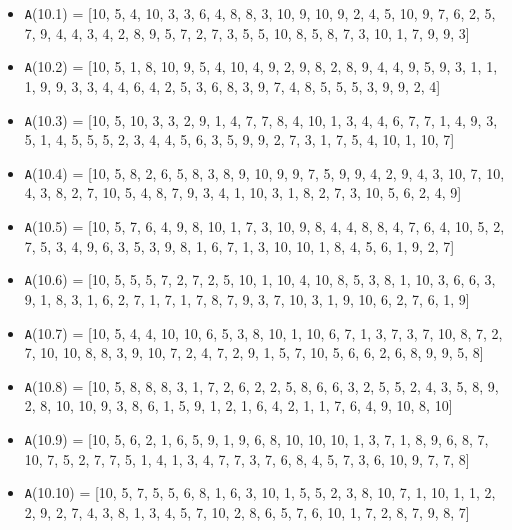 \documentclass[runningheads, a4paper]{llncs}
\begin{document}
\begin{itemize}
	\item {\texttt A(10.1) = } [10, 5, 4, 10, 3, 3, 6, 4, 8, 8, 3, 10, 9, 10, 9, 2, 4, 5, 10, 9, 7, 6, 2, 5, 7, 9, 4, 4, 3, 4, 2, 8, 9, 5, 7, 2, 7, 3, 5, 5, 10, 8, 5, 8, 7, 3, 10, 1, 7, 9, 9, 3]
	\item {\texttt A(10.2) = } [10, 5, 1, 8, 10, 9, 5, 4, 10, 4, 9, 2, 9, 8, 2, 8, 9, 4, 4, 9, 5, 9, 3, 1, 1, 1, 9, 9, 3, 3, 4, 4, 6, 4, 2, 5, 3, 6, 8, 3, 9, 7, 4, 8, 5, 5, 5, 3, 9, 9, 2, 4]
	\item {\texttt A(10.3) = } [10, 5, 10, 3, 3, 2, 9, 1, 4, 7, 7, 8, 4, 10, 1, 3, 4, 4, 6, 7, 7, 1, 4, 9, 3, 5, 1, 4, 5, 5, 5, 2, 3, 4, 4, 5, 6, 3, 5, 9, 9, 2, 7, 3, 1, 7, 5, 4, 10, 1, 10, 7]
	\item {\texttt A(10.4) = } [10, 5, 8, 2, 6, 5, 8, 3, 8, 9, 10, 9, 9, 7, 5, 9, 9, 4, 2, 9, 4, 3, 10, 7, 10, 4, 3, 8, 2, 7, 10, 5, 4, 8, 7, 9, 3, 4, 1, 10, 3, 1, 8, 2, 7, 3, 10, 5, 6, 2, 4, 9]
	\item {\texttt A(10.5) = } [10, 5, 7, 6, 4, 9, 8, 10, 1, 7, 3, 10, 9, 8, 4, 4, 8, 8, 4, 7, 6, 4, 10, 5, 2, 7, 5, 3, 4, 9, 6, 3, 5, 3, 9, 8, 1, 6, 7, 1, 3, 10, 10, 1, 8, 4, 5, 6, 1, 9, 2, 7]
	\item {\texttt A(10.6) = } [10, 5, 5, 5, 7, 2, 7, 2, 5, 10, 1, 10, 4, 10, 8, 5, 3, 8, 1, 10, 3, 6, 6, 3, 9, 1, 8, 3, 1, 6, 2, 7, 1, 7, 1, 7, 8, 7, 9, 3, 7, 10, 3, 1, 9, 10, 6, 2, 7, 6, 1, 9]
	\item {\texttt A(10.7) = } [10, 5, 4, 4, 10, 10, 6, 5, 3, 8, 10, 1, 10, 6, 7, 1, 3, 7, 3, 7, 10, 8, 7, 2, 7, 10, 10, 8, 8, 3, 9, 10, 7, 2, 4, 7, 2, 9, 1, 5, 7, 10, 5, 6, 6, 2, 6, 8, 9, 9, 5, 8]
	\item {\texttt A(10.8) = } [10, 5, 8, 8, 8, 3, 1, 7, 2, 6, 2, 2, 5, 8, 6, 6, 3, 2, 5, 5, 2, 4, 3, 5, 8, 9, 2, 8, 10, 10, 9, 3, 8, 6, 1, 5, 9, 1, 2, 1, 6, 4, 2, 1, 1, 7, 6, 4, 9, 10, 8, 10]
	\item {\texttt A(10.9) = } [10, 5, 6, 2, 1, 6, 5, 9, 1, 9, 6, 8, 10, 10, 10, 1, 3, 7, 1, 8, 9, 6, 8, 7, 10, 7, 5, 2, 7, 7, 5, 1, 4, 1, 3, 4, 7, 7, 3, 7, 6, 8, 4, 5, 7, 3, 6, 10, 9, 7, 7, 8]
	\item {\texttt A(10.10) = } [10, 5, 7, 5, 5, 6, 8, 1, 6, 3, 10, 1, 5, 5, 2, 3, 8, 10, 7, 1, 10, 1, 1, 2, 2, 9, 2, 7, 4, 3, 8, 1, 3, 4, 5, 7, 10, 2, 8, 6, 5, 7, 6, 10, 1, 7, 2, 8, 7, 9, 8, 7]	
%
\end{itemize}
\end{document}
